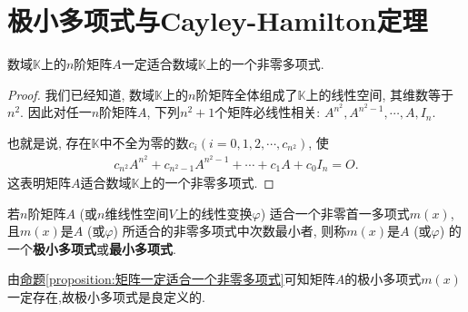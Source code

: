 \documentclass[../../main.tex]{subfiles}%
\begin{document}
\section{极小多项式与Cayley-Hamilton定理}

\begin{proposition}\label{proposition:矩阵一定适合一个非零多项式}
数域$\mathbb{K}$上的$n$阶矩阵$A$一定适合数域$\mathbb{K}$上的一个非零多项式.
\end{proposition}
\begin{proof}

我们已经知道, 数域$\mathbb{K}$上的$n$阶矩阵全体组成了$\mathbb{K}$上的线性空间, 其维数等于$n^2$. 因此对任一$n$阶矩阵$A$, 下列$n^2 + 1$个矩阵必线性相关:
$A^{n^2}, A^{n^2-1}, \cdots, A, I_n$.

也就是说, 存在$\mathbb{K}$中不全为零的数$c_i (i = 0, 1, 2, \cdots, c_{n^2})$, 使
\begin{align*}
c_{n^2}A^{n^2} + c_{n^2-1}A^{n^2-1} + \cdots + c_1A + c_0I_n = O.
\end{align*}
这表明矩阵$A$适合数域$\mathbb{K}$上的一个非零多项式.

\end{proof}

\begin{definition}[矩阵的极小多项式]
若$n$阶矩阵$A$ (或$n$维线性空间$V$上的线性变换$\varphi$) 适合一个非零首一多项式$m(x)$, 且$m(x)$是$A$ (或$\varphi$) 所适合的非零多项式中次数最小者, 则称$m(x)$是$A$ (或$\varphi$) 的一个\textbf{极小多项式}或\textbf{最小多项式}.
\end{definition}
\begin{remark}
由\hyperref[proposition:矩阵一定适合一个非零多项式]{命题\ref{proposition:矩阵一定适合一个非零多项式}}可知矩阵$A$的极小多项式$m(x)$一定存在,故极小多项式是良定义的.
\end{remark}
\end{document}
